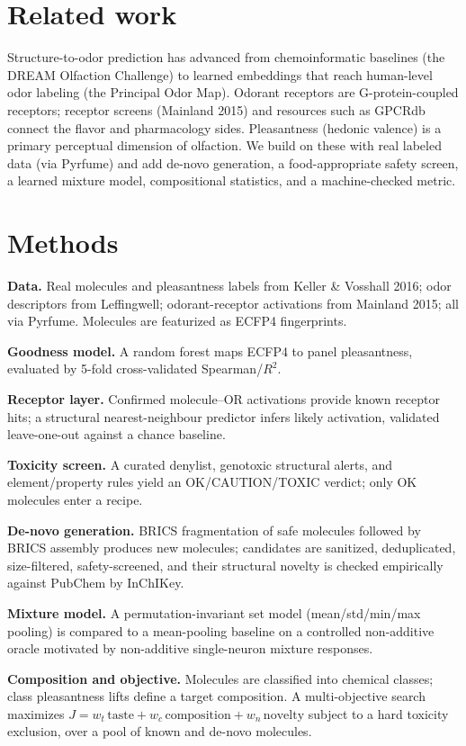 \documentclass[11pt]{article}
\begin{document}
\section{Related work}
Structure-to-odor prediction has advanced from chemoinformatic baselines (the DREAM Olfaction
Challenge) to learned embeddings that reach human-level odor labeling (the Principal Odor Map).
Odorant receptors are G-protein-coupled receptors; receptor screens (Mainland 2015) and
resources such as GPCRdb connect the flavor and pharmacology sides. Pleasantness (hedonic
valence) is a primary perceptual dimension of olfaction. We build on these with real labeled
data (via Pyrfume) and add de-novo generation, a food-appropriate safety screen, a learned
mixture model, compositional statistics, and a machine-checked metric.

\section{Methods}
\textbf{Data.} Real molecules and pleasantness labels from Keller \& Vosshall 2016; odor
descriptors from Leffingwell; odorant-receptor activations from Mainland 2015; all via Pyrfume.
Molecules are featurized as ECFP4 fingerprints.

\textbf{Goodness model.} A random forest maps ECFP4 to panel pleasantness, evaluated by 5-fold
cross-validated Spearman/$R^2$.

\textbf{Receptor layer.} Confirmed molecule--OR activations provide known receptor hits; a
structural nearest-neighbour predictor infers likely activation, validated leave-one-out
against a chance baseline.

\textbf{Toxicity screen.} A curated denylist, genotoxic structural alerts, and element/property
rules yield an OK/CAUTION/TOXIC verdict; only OK molecules enter a recipe.

\textbf{De-novo generation.} BRICS fragmentation of safe molecules followed by BRICS assembly
produces new molecules; candidates are sanitized, deduplicated, size-filtered, safety-screened,
and their structural novelty is checked empirically against PubChem by InChIKey.

\textbf{Mixture model.} A permutation-invariant set model (mean/std/min/max pooling) is compared
to a mean-pooling baseline on a controlled non-additive oracle motivated by non-additive
single-neuron mixture responses.

\textbf{Composition and objective.} Molecules are classified into chemical classes; class
pleasantness lifts define a target composition. A multi-objective search maximizes
$J = w_t\,\mathrm{taste} + w_c\,\mathrm{composition} + w_n\,\mathrm{novelty}$ subject to a hard
toxicity exclusion, over a pool of known and de-novo molecules.
\end{document}

